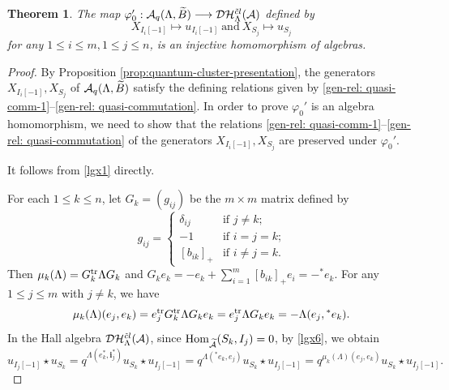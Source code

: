 \documentclass[reqno,12pt]{amsart}
\numberwithin{equation}{section}
\theoremstyle{plain} %
\newtheorem{theorem}{\bf Theorem}[section]
\theoremstyle{definition} %
\begin{document}
\begin{theorem}\label{chtgthm}
The map $\varphi_0':\mathcal{A}_q(\Lambda,\widetilde{B})\longrightarrow\mathcal {D}\mathcal {H}_\Lambda^{{\tilde{c}l}}({\mathcal{A}})$ defined by $$X_{I_i[-1]}\mapsto u_{I_i[-1]}~\text{and}~X_{S_j}\mapsto u_{S_j}$$ for any $1\leq i\leq m, 1\leq j\leq n$, is an injective homomorphism of algebras.
\end{theorem}
\begin{proof}
By Proposition \ref{prop:quantum-cluster-presentation}, the generators $X_{I_i[-1]}, X_{S_j}$ of $\mathcal{A}_q(\Lambda,\widetilde{B})$ satisfy the defining relations given by \eqref{gen-rel: quasi-comm-1}--\eqref{gen-rel: quasi-commutation}. In order to prove $\varphi_0'$ is an algebra homomorphism, we need to show that the relations \eqref{gen-rel: quasi-comm-1}--\eqref{gen-rel: quasi-commutation} of the generators $X_{I_i[-1]}, X_{S_j}$  are preserved under $\varphi_0'$.



It follows from \eqref{lgx1} directly.

For each $1\leq k\leq n$, let $G_k=(g_{ij})$ be the $m\times m$ matrix defined by
\[g_{ij}=\begin{cases}
\delta_{ij} & \text{if $j\ne k$;}\\
-1 & \text{if $i=j=k$;}\\
[b_{ik}]_{+} & \text{if $i\ne j = k$.}
\end{cases}
\]
Then $\mu_k(\Lambda)=G_k^{\rm tr}\Lambda G_k$
and $G_ke_k=-e_k+\sum_{i=1}^m[b_{ik}]_+e_i=-^\ast e_k$.
For any $1\leq j\leq m$ with $j\neq k$, we have
\begin{align*}
    \mu_k(\Lambda)(e_j,e_k)=e_j^{\rm tr}G_k^{\rm tr}\Lambda G_ke_k
    =e_j^{\rm tr}\Lambda G_ke_k
    =-\Lambda(e_j,{^\ast e_k}).
\end{align*}
In the Hall algebra $\mathcal {D}\mathcal {H}_\Lambda^{{\tilde{c}l}}({\mathcal{A}})$, since $\mbox{\rm Hom}_{\widetilde{\mathcal{A}}}(S_k, I_j)=0$, by \eqref{lgx6}, we obtain
\[
u_{I_j[-1]}\star u_{S_k}=q^{\Lambda(e_k^\ast,\mathbf{i}_j^\ast)}u_{S_k}\star u_{I_{j}[-1]}=q^{\Lambda({^\ast e}_k,e_j)}u_{S_k}\star u_{I_{j}[-1]}=q^{\mu_k(\Lambda)(e_j,e_k)}u_{S_k}\star u_{I_{j}[-1]}.\]



\end{proof}
\end{document}
